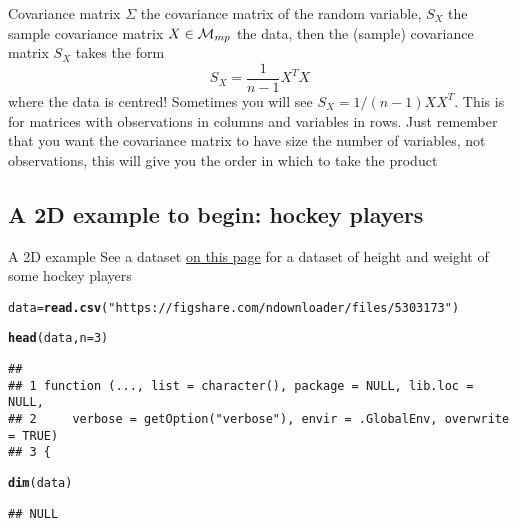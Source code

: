 \documentclass[aspectratio=169]{beamer}\usepackage[]{graphicx}\usepackage[]{xcolor}
\makeatletter
\newcommand{\hlnum}[1]{\textcolor[rgb]{0.686,0.059,0.569}{#1}}%
\newcommand{\hlsng}[1]{\textcolor[rgb]{0.192,0.494,0.8}{#1}}%
\newcommand{\hldef}[1]{\textcolor[rgb]{0.345,0.345,0.345}{#1}}%
\newcommand{\hlkwb}[1]{\textcolor[rgb]{0.69,0.353,0.396}{#1}}%
\newcommand{\hlkwc}[1]{\textcolor[rgb]{0.333,0.667,0.333}{#1}}%
\newcommand{\hlkwd}[1]{\textcolor[rgb]{0.737,0.353,0.396}{\textbf{#1}}}%
\newenvironment{kframe}{%
 \def\at@end@of@kframe{}%
 \ifinner\ifhmode%
  \def\at@end@of@kframe{\end{minipage}}%
  \begin{minipage}{\columnwidth}%
 \fi\fi%
 \def\FrameCommand##1{\hskip\@totalleftmargin \hskip-\fboxsep
 \colorbox{shadecolor}{##1}\hskip-\fboxsep
     \hskip-\linewidth \hskip-\@totalleftmargin \hskip\columnwidth}%
 \MakeFramed {\advance\hsize-\width
   \@totalleftmargin\z@ \linewidth\hsize
   \@setminipage}}%
 {\par\unskip\endMakeFramed%
 \at@end@of@kframe}
\newenvironment{knitrout}{}{} %
\makeatother
\begin{document}
\begin{frame}{Covariance matrix}
$\Sigma$ the covariance matrix of the random variable, $S_X$ the sample covariance matrix
\vfill
$X\in\mathcal{M}_{mp}$ the data, then the (sample) covariance matrix $S_X$ takes the form
\[
S_X = \frac{1}{n-1}X^TX
\]
where the data is centred!
\vfill
Sometimes you will see $S_X=1/(n-1)XX^T$. This is for matrices with observations in columns and variables in rows. Just remember that you want the covariance matrix to have size the number of variables, not observations, this will give you the order in which to take the product
\end{frame}

\subsection{A 2D example to begin: hockey players}

\begin{frame}[fragile]{A 2D example}
See a dataset \href{https://opendata.stackexchange.com/questions/7793/age-weight-and-height-dataset}{on this page} for a dataset of height and weight of some hockey players
\vfill
\begin{knitrout}
\color{fgcolor}\begin{kframe}
\begin{alltt}
\hldef{data} \hlkwb{=} \hlkwd{read.csv}\hldef{(}\hlsng{"https://figshare.com/ndownloader/files/5303173"}\hldef{)}
\end{alltt}


{\ttfamily\noindent\bfseries{}}\begin{alltt}
\hlkwd{head}\hldef{(data,} \hlkwc{n}\hldef{=}\hlnum{3}\hldef{)}
\end{alltt}
\begin{verbatim}
##                                                                             
## 1 function (..., list = character(), package = NULL, lib.loc = NULL,        
## 2     verbose = getOption("verbose"), envir = .GlobalEnv, overwrite = TRUE) 
## 3 {
\end{verbatim}
\begin{alltt}
\hlkwd{dim}\hldef{(data)}
\end{alltt}
\begin{verbatim}
## NULL
\end{verbatim}
\end{kframe}
\end{knitrout}
\end{frame}
\end{document}
